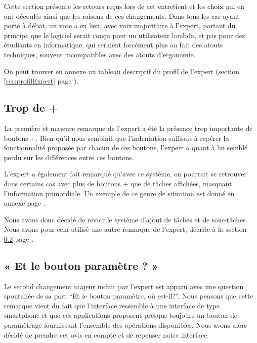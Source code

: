 \documentclass[11pt]{article}
\begin{document}
Cette section présente les retours reçus lors de cet entretient et les
choix qui en ont découlés ainsi que les raisons de ces changements.
Dans tous les cas ayant porté à débat, un vote a eu lieu, avec voix
majoritaire à l'expert, partant du principe que le logiciel serait
conçu pour un utilisateur lambda, et pas pour des étudiants en
informatique, qui seraient forcément plus au fait des atouts
techniques, souvent incompatibles avec des atouts d'ergonomie.

On peut trouver en annexe un tableau descriptif du profil de l'expert
(section \ref{sec:profilExpert} page \pageref{sec:profilExpert}).

\subsection{Trop de +}

La première et majeure remarque de l'expert a été la présence trop
importante de boutons +. Bien qu'il nous semblait que l'indentation
suffisait à repérer la fonctionnalité proposée par chacun de ces
boutons, l'expert a quant à lui semblé perdu sur les différences entre
ces boutons.

L'expert a également fait remarqué qu'avec ce système, on pourrait se
retrouver dans certains cas avec plus de boutons + que de tâches
affichées, masquant l'information primordiale. Un exemple de ce genre
de situation est donné en annexe page \pageref{ann:plusplusplus}.

Nous avons donc décidé de revoir le système d'ajout de tâches et de
sous-tâches. Nous avons pour cela utilisé une autre remarque de
l'expert, décrite à la section \ref{subsec:parameterButton} page
\pageref{subsec:parameterButton}.




\subsection{« Et le bouton paramètre ? »}
\label{subsec:parameterButton}


Le second changement majeur induit par l'expert est apparu avec une
question spontanée de sa part ``Et le bouton paramètre, où
est-il?''. Nous pensons que cette remarque vient du fait que
l'interface ressemble à une interface de type smartphone et que ces
applications proposent presque toujours un bouton de paramètrage
fournissant l'ensemble des opérations disponibles. Nous avons alors
décidé de prendre cet avis en compte et de repenser notre interface.
\end{document}
